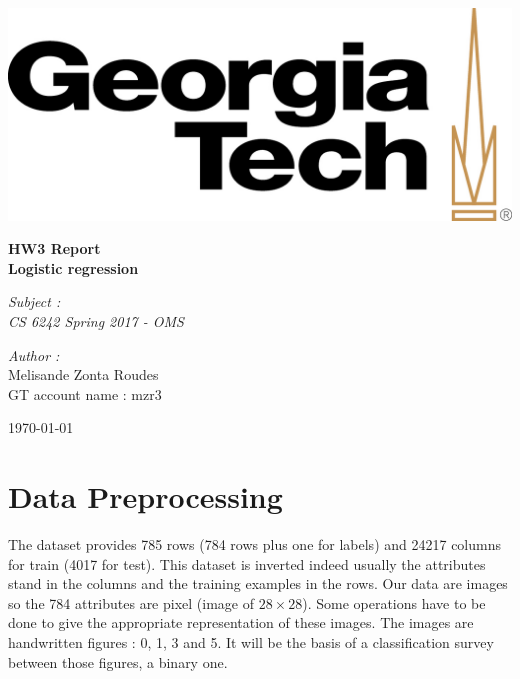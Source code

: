 \documentclass[a4paper,11pt]{article}
\begin{document}

\begin{center}
\includegraphics[scale=0.4]{GT_logo.jpeg}
\end{center}
\hrulefill
\begin{center}\bfseries\huge
   HW3 Report \\
    Logistic regression\\
    \hrulefill
\end{center}
\vspace*{1cm}
\begin{minipage}[t]{0.4\textwidth}
  \begin{flushleft} \large
    \emph{Subject : \\
    CS 6242 Spring 2017 - OMS}\\
  \end{flushleft}
\end{minipage}
\begin{minipage}[t]{0.6\textwidth}
  \begin{flushright} \large
    \emph{Author :} \\
    Melisande Zonta Roudes \\
    GT account name : mzr3 \\
  \end{flushright}
\end{minipage}
\begin{flushright}
        \today 
\end{flushright} 

\newpage

\section{Data Preprocessing}

The dataset provides 785 rows (784 rows plus one for labels) and 24217 columns for train (4017 for test).
This dataset is inverted indeed usually the attributes stand in the columns and the training examples in the rows. Our data are images so the 784 attributes are pixel (image of $28\times28$). Some operations have to be done to give the appropriate representation of these images. The images are handwritten figures : 0, 1, 3 and 5. It will be the basis of a classification survey between those figures, a binary one.
\end{document}
